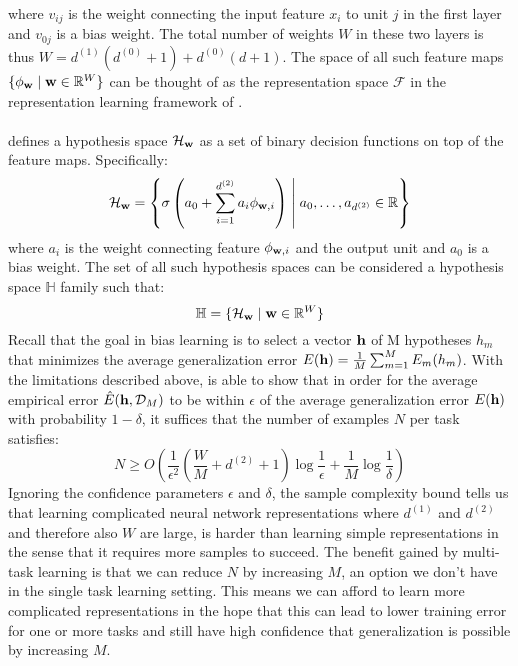where $v_{ij}$ is the weight connecting the input feature $x_i$ to unit $j$ in the first layer and $v_{0j}$ is a bias weight. The total number of weights $W$ in these two layers is thus $W = d^{(1)}(d^{(0)} + 1) + d^{(0)}(d + 1)$. The space of all such feature maps $\{\phi_{\mathbf{w}} \mid \mathbf{w} \in \mathbb{R}^W\}$ can be thought of as the representation space $\mathcal{F}$ in the representation learning framework of \citet{baxter1995}.
\\\\
\cite{baxter2000} defines a hypothesis space $\mathcal{H}_{\mathbf{w}}$ as a set of binary decision functions on top of the feature maps. Specifically:
$$
\mathcal{H}_{\mathbf{w}} = \left\{ \sigma\left(  a_{0} + \sum\limits_{i=1}^{d^{(2)}} a_i\phi_{\mathbf{w},i}\right) \;\middle| \; a_{0},\dots,a_{d^{(2)}} \in \mathbb{R} \right\}
$$
where $a_i$ is the weight connecting feature $\phi_{\mathbf{w},i}$ and the output unit and $a_0$ is a bias weight. The set of all such hypothesis spaces can be considered a hypothesis space $\mathbb{H}$ family such that:
$$
\mathbb{H} = \{\mathcal{H}_{\mathbf{w}} \mid \mathbf{w} \in \mathbb{R}^W\}
$$
Recall that the goal in bias learning is to select a vector $\mathbf{h}$ of M hypotheses $h_m$ that minimizes the average generalization error $E(\mathbf{h}) = \frac{1}{M}\sum_{m=1}^M E_m(h_m)$. With the limitations described above, \citet{baxter2000} is able to show that in order for the average empirical error $\hat{E}(\mathbf{h}, \mathcal{D}_M)$ to be within $\epsilon$ of the average generalization error $E(\mathbf{h})$ with probability $1 - \delta$, it suffices that the number of examples $N$ per task satisfies:
$$
N \geq O\left( \frac{1}{\epsilon^2}\left( \frac{W}{M} + d^{(2)} + 1\right)\log \frac{1}{\epsilon} + \frac{1}{M}\log\frac{1}{\delta} \right)
$$
Ignoring the confidence parameters $\epsilon$ and $\delta$, the sample complexity bound tells us that learning complicated neural network representations where $d^{(1)}$ and $d^{(2)}$ and therefore also $W$ are large, is harder than learning simple representations in the sense that it requires more samples to succeed. The benefit gained by multi-task learning is that we can reduce $N$ by increasing $M$, an option we don't have in the single task learning setting. This means we can afford to learn more complicated representations in the hope that this can lead to lower training error for one or more tasks and still have high confidence that generalization is possible by increasing $M$.